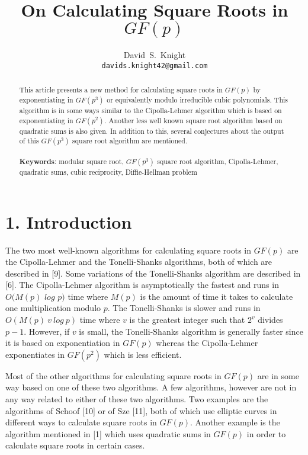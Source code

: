 \documentclass[final,letterpaper,oneside,10pt]{article}
\author{David~S.~Knight \\  \texttt{davids.knight42@gmail.com}}
\date{}
\title{On Calculating Square Roots in $GF(p)$}
\begin{document}
\maketitle



\begin {abstract} 
This article presents a new method for calculating square roots in $GF(p)$
by exponentiating in $GF(p^3)$ or equivalently modulo irreducible cubic polynomials.  This algorithm
is in some ways similar to the Cipolla-Lehmer algorithm which is based on exponentiating in $GF(p^2)$.
Another less well known square root algorithm based on quadratic sums is also given.  In addition to this,
several conjectures about the output of this $GF(p^3)$ square root algorithm are mentioned.
\\
\\
\textbf{Keywords}: modular square root, $GF(p^3)$ square root algorithm,
Cipolla-Lehmer, quadratic sums, cubic reciprocity, Diffie-Hellman problem

\end{abstract}


\section*{1. Introduction}
The two most well-known algorithms for calculating square roots in $GF(p)$ are the Cipolla-Lehmer and the 
Tonelli-Shanks algorithms, both of which are described in [9].  Some variations of the Tonelli-Shanks algorithm
are described in [6].  The Cipolla-Lehmer algorithm is asymptotically the fastest and runs in $O(M(p)$ $log$  $p)$ time
where $M(p)$ is the amount of time it takes to calculate one multiplication modulo $p$.  The Tonelli-Shanks is slower 
and runs in $O(M(p)~v~log~p)$ time where $v$ is the greatest integer such that $2^v$ divides $p-1$.
However, if $v$ is small, the Tonelli-Shanks algorithm is generally faster since it is based on exponentiation in $GF(p)$
whereas the Cipolla-Lehmer exponentiates in $GF(p^2)$ which is less efficient.

Most of the other algorithms for calculating square roots in $GF(p)$ are in some way based on one of these two 
algorithms.  A few algorithms, however are not in any way related to either of these two algorithms.  Two examples 
are the algorithms of Schoof [10] or of Sze [11], both of which use elliptic curves in different ways to calculate square
roots in $GF(p)$.  Another example is the algorithm mentioned in [1] which uses quadratic sums in $GF(p)$
in order to calculate square roots in certain cases.
\end{document}
